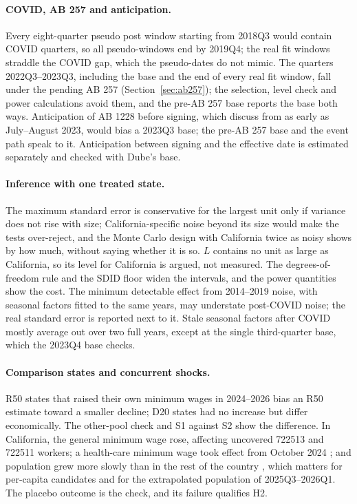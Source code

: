 \paragraph{COVID, AB 257 and anticipation.} Every eight-quarter pseudo post window starting from
2018Q3 would contain COVID quarters, so all pseudo-windows end by 2019Q4; the real fit windows
straddle the COVID gap, which the pseudo-dates do not mimic. The quarters 2022Q3--2023Q3, including
the base and the end of every real fit window, fall under the pending AB 257
(Section~\ref{sec:ab257}); the selection, level check and power calculations avoid them, and the
pre-AB 257 base reports the base both ways. Anticipation of AB 1228 before signing, which
\citet{sosinskiy2026effects} discuss from as early as July--August 2023, would bias a 2023Q3 base; the
pre-AB 257 base and the event path speak to it. Anticipation between signing and the effective date
is estimated separately and checked with Dube's base.

\paragraph{Inference with one treated state.} The maximum standard error is conservative for the
largest unit only if variance does not rise with size; California-specific noise beyond its size
would make the tests over-reject, and the Monte Carlo design with California twice as noisy shows by
how much, without saying whether it is so. $L$ contains no unit as large as California, so its level
for California is argued, not measured. The degrees-of-freedom rule and the SDID floor widen the
intervals, and the power quantities show the cost. The minimum detectable effect from 2014--2019
noise, with seasonal factors fitted to the same years, may understate post-COVID noise; the real
standard error is reported next to it. Stale seasonal factors after COVID mostly average out over
two full years, except at the single third-quarter base, which the 2023Q4 base checks.

\paragraph{Comparison states and concurrent shocks.} R50 states that raised their own minimum wages
in 2024--2026 bias an R50 estimate toward a smaller decline; D20 states had no increase but differ
economically. The other-pool check and S1 against S2 show the difference. In California, the general
minimum wage rose, affecting uncovered 722513 and 722511 workers; a health-care minimum wage took
effect from October 2024 \citep{clemens2026employment}; and population grew more slowly than in the
rest of the country \citep{clemens2026employment}, which matters for per-capita candidates and for the extrapolated population of
2025Q3--2026Q1. The placebo outcome is the check, and its failure qualifies H2.

